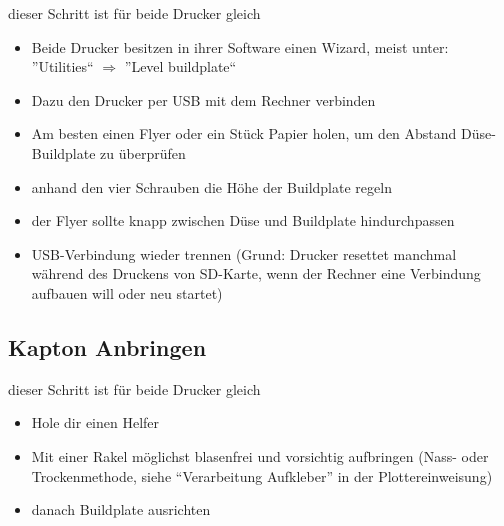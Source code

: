 \documentclass{\basedir/fablab-document}
\begin{document}
dieser Schritt ist für beide Drucker gleich
\begin{itemize}
\item Beide Drucker besitzen in ihrer Software einen Wizard, meist unter: ''Utilities`` $\Rightarrow$ ''Level buildplate``
\item Dazu den Drucker per USB mit dem Rechner verbinden
\item Am besten einen Flyer oder ein Stück Papier holen, um den Abstand Düse-Buildplate zu überprüfen
\item anhand den vier Schrauben die Höhe der Buildplate regeln
\item der Flyer sollte knapp zwischen Düse und Buildplate hindurchpassen
\item USB-Verbindung wieder trennen (Grund: Drucker resettet manchmal während des Druckens von SD-Karte, wenn der Rechner eine Verbindung aufbauen will oder neu startet)
\end{itemize}

\subsection{Kapton Anbringen}

dieser Schritt ist für beide Drucker gleich
\begin{itemize}
\item Hole dir einen Helfer
\item Mit einer Rakel möglichst blasenfrei und vorsichtig aufbringen (Nass- oder Trockenmethode, siehe \enquote{Verarbeitung Aufkleber} in der Plottereinweisung)
\item danach Buildplate ausrichten
\end{itemize}
\end{document}
